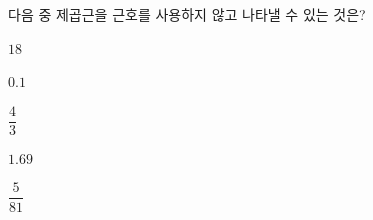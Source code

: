 다음 중 제곱근을 근호를 사용하지 않고 나타낼 수 있는 것은?
\begin{choices32}{\rule[-3ex]{0pt}{8ex}$18$}{\rule[-3ex]{0pt}{8ex}$0.1$}{\rule[-3ex]{0pt}{8ex}$\dfrac{4}{3}$}{\rule[-3ex]{0pt}{8ex}$1.69$}{\rule[-3ex]{0pt}{8ex}$\dfrac{5}{81}$}\end{choices32}
